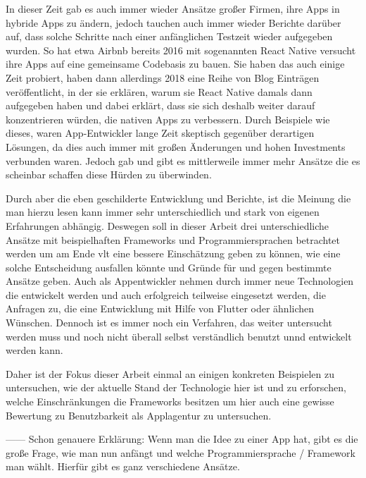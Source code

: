 In dieser Zeit gab es auch immer wieder Ansätze großer Firmen, ihre Apps in hybride Apps zu ändern, jedoch tauchen auch immer wieder Berichte darüber auf, dass solche Schritte nach einer anfänglichen Testzeit wieder aufgegeben wurden. So hat etwa Airbnb bereits 2016 mit sogenannten React Native versucht ihre Apps auf eine gemeinsame Codebasis zu bauen. Sie haben das auch einige Zeit probiert, haben dann allerdings 2018 eine Reihe von Blog Einträgen veröffentlicht, in der sie erklären, warum sie React Native damals dann aufgegeben haben und dabei erklärt, dass sie sich deshalb weiter darauf konzentrieren würden, die nativen Apps zu verbessern. 
Durch Beispiele wie dieses, waren App-Entwickler lange Zeit skeptisch gegenüber derartigen Lösungen, da dies auch immer mit großen Änderungen und hohen Investments verbunden waren.
Jedoch gab und gibt es mittlerweile immer mehr Ansätze die es scheinbar schaffen diese Hürden zu überwinden.
\cite{Lee2008_2layer}

Durch aber die eben geschilderte Entwicklung und Berichte, ist die Meinung die man hierzu lesen kann immer sehr unterschiedlich und stark von eigenen Erfahrungen abhängig. 
Deswegen soll in dieser Arbeit drei unterschiedliche Ansätze mit beispielhaften Frameworks und Programmiersprachen betrachtet werden um am Ende vlt eine bessere Einschätzung geben zu können, wie eine solche Entscheidung ausfallen könnte und Gründe für und gegen bestimmte Ansätze geben.
Auch als Appentwickler nehmen durch immer neue Technologien die entwickelt werden und auch erfolgreich teilweise eingesetzt werden, die Anfragen zu, die eine Entwicklung mit Hilfe von Flutter oder ähnlichen Wünschen. Dennoch ist es immer noch ein Verfahren, das weiter untersucht werden muss und noch nicht überall selbst verständlich benutzt unnd entwickelt werden kann.

Daher ist der Fokus dieser Arbeit einmal an einigen konkreten Beispielen zu untersuchen, wie der aktuelle Stand der Technologie hier ist und zu erforschen, welche Einschränkungen die Frameworks besitzen um hier auch eine gewisse Bewertung zu Benutzbarkeit als Applagentur zu untersuchen.

------
Schon genauere Erklärung:
Wenn man die Idee zu einer App hat, gibt es die große Frage, wie man nun anfängt und welche Programmiersprache / Framework man wählt. Hierfür gibt es ganz verschiedene Ansätze.  

